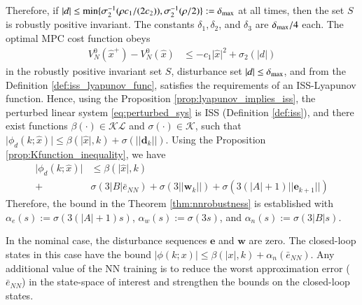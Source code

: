 \documentclass[preprint,5p, twocolumn, authoryear]{elsarticle}
\begin{document}
Therefore, if 
$\vert d \vert \leq \textnormal{min} \{ \sigma_2^{-1}(\rho c_1/(2c_2)), 
\sigma_2^{-1}(\rho/2)\} := \delta_{\textnormal{max}}$ 
at all times, then the set $S$ is 
robustly positive invariant. The constants 
$\delta_1, \delta_2$, and $\delta_3$ are 
$\delta_{\textnormal{max}}/4$ each. The optimal
MPC cost function obeys
\begin{align*}
    V_N^0(\hat{x}^+) - V_N^0(\hat{x}) &\leq 
    -c_1\vert \hat{x} \vert^2 + \sigma_2(\vert d \vert)
\end{align*}
in the robustly positive invariant set $S$,
disturbance set $\vert d \vert \leq \delta_{\textnormal{max}}$,
and from the Definition \ref{def:iss_lyapunov_func},
satisfies the requirements of an ISS-Lyapunov function.
Hence, using the Proposition \ref{prop:lyapunov_implies_iss}, 
the perturbed linear system \ref{eq:perturbed_sys} is
ISS (Definition \ref{def:iss}), 
and there exist functions 
$\beta(\cdot) \in \mathcal{K}\mathcal{L}$ and 
$\sigma(\cdot) \in \mathcal{K}$, such that 
$\vert \phi_d(k; \hat{x}) \vert \leq \beta(\vert \hat{x} \vert, k) 
+ \sigma(\vert\vert \mathbf{d}_k\vert\vert)$. Using the Proposition
\ref{prop:Kfunction_inequality}, we have 
\begin{align*}
    \vert \phi_d(k; \hat{x}) \vert & \leq \beta(\vert \hat{x} \vert, k) \\
    + &\sigma(3\vert B\vert\bar{e}_{NN}) + 
    \sigma(3\vert \vert \mathbf{w}_k \vert \vert)
    + \sigma(3(\vert A\vert + 1)\vert \vert \mathbf{e}_{k+1} \vert\vert)
\end{align*}
Therefore, the bound in the Theorem \ref{thm:nnrobustness} is established with 
$\alpha_e(s) := \sigma(3(\vert A\vert + 1)s)$, 
$\alpha_w(s) := \sigma(3s)$, and
$\alpha_n(s) := \sigma(3\vert B\vert s)$.

In the nominal case, 
the disturbance sequences $\mathbf{e}$ and $\mathbf{w}$ are zero.
The closed-loop states in this case have the bound
$\vert \phi(k; x) \vert \leq \beta(\vert x \vert, k) + 
\alpha_n(\bar{e}_{NN})$. Any additional value of 
the NN training is to reduce the worst 
approximation error ($\bar{e}_{NN}$) 
in the state-space of interest and 
strengthen the bounds on the closed-loop states. 
\end{document}
